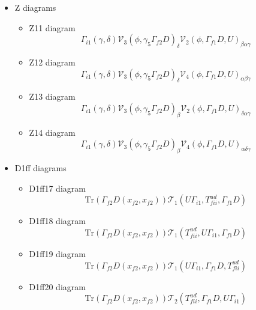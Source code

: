 \documentclass{article}[12pt]
\begin{document}
\begin{itemize}
\begin{itemize}
$$$$
$$
{\mathcal V}_5(i2,f2)_{\beta\delta}{\mathcal V}_6(i2,f2)_{\alpha\gamma}(phiui2,phidf2U)
$$
\end{itemize}
\item Z diagrams
\begin{itemize}
\item Z11 diagram
$$
\Gamma_{i1}\left(\gamma,\delta\right){\mathcal V}_3\left(\phi,\gamma_5\Gamma_{f2}D\right)_\delta{\mathcal V}_2\left(\phi,\Gamma_{f1}D,U\right)_{\beta\alpha\gamma}
$$
\item Z12 diagram
$$
\Gamma_{i1}\left(\gamma,\delta\right){\mathcal V}_3\left(\phi,\gamma_5\Gamma_{f2}D\right)_\delta{\mathcal V}_4\left(\phi,\Gamma_{f1}D,U\right)_{\alpha\beta\gamma}
$$
\item Z13 diagram
$$
\Gamma_{i1}\left(\gamma,\delta\right){\mathcal V}_3\left(\phi,\gamma_5\Gamma_{f2}D\right)_\beta{\mathcal V}_2\left(\phi,\Gamma_{f1}D,U\right)_{\delta\alpha\gamma}
$$
\item Z14 diagram
$$
\Gamma_{i1}\left(\gamma,\delta\right){\mathcal V}_3\left(\phi,\gamma_5\Gamma_{f2}D\right)_\beta{\mathcal V}_4\left(\phi,\Gamma_{f1}D,U\right)_{\alpha\delta\gamma}
$$
\end{itemize}
\item D1ff diagrams
\begin{itemize}
\item D1ff17 diagram
$$
\mathrm{Tr}\left(\Gamma_{f2}D\left(x_{f2},x_{f2}\right)\right){\mathcal T}_1\left(U\Gamma_{i1},T^{ud}_{fii},\Gamma_{f1}D\right)
$$
\item D1ff18 diagram
$$
\mathrm{Tr}\left(\Gamma_{f2}D\left(x_{f2},x_{f2}\right)\right){\mathcal T}_1\left(T^{ud}_{fii},U\Gamma_{i1},\Gamma_{f1}D\right)
$$
\item D1ff19 diagram
$$
\mathrm{Tr}\left(\Gamma_{f2}D\left(x_{f2},x_{f2}\right)\right){\mathcal T}_1\left(U\Gamma_{i1},\Gamma_{f1}D,T^{ud}_{fii}\right)
$$
\item D1ff20 diagram
$$
\mathrm{Tr}\left(\Gamma_{f2}D\left(x_{f2},x_{f2}\right)\right){\mathcal T}_2\left(T^{ud}_{fii},\Gamma_{f1}D,U\Gamma_{i1}\right)
$$
\end{itemize}
\end{itemize}
\end{document}
